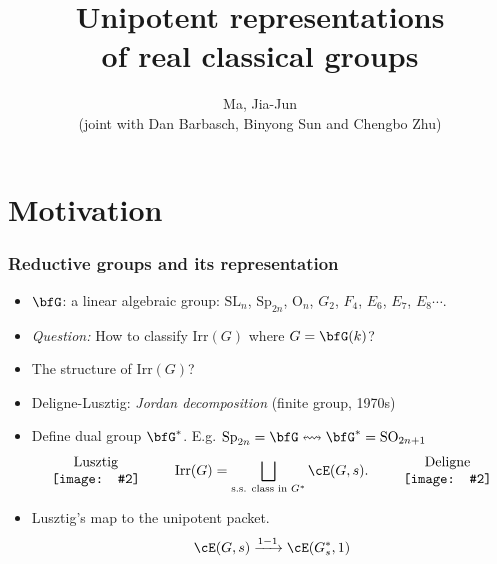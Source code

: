 \documentclass[t,11pt,usenames,dvipsnames]{beamer}
\title[Uni. Repn.]{Unipotent representations \\
of real classical groups}
\author[Ma, Jia-Jun]{Ma, Jia-Jun\\[2em] 
(joint with Dan Barbasch, Binyong Sun and  Chengbo Zhu)
}
\institute[SJTU]{School of Mathematical Sciences\\
Shanghai Jiao Tong University}
\theoremstyle{plain}
\theoremstyle{definition}
\newcommand{\rO}{\mathrm{O}}
\newcommand{\SO}{\mathrm{SO}}
\def\Sp{{\mathrm{Sp}}}
\def\SL{{\mathrm{SL}}}
\def\Irr{{\mathrm{Irr}}}
\def\blue{\color{blue}}
\let\oldemph\emph
\def\emph#1{\oldemph{\blue #1}}
\begin{document}
\begin{frame}[plain,label=tt]
    
    \titlepage
    \vspace{-3em}
\end{frame}



\def\vgraph#1#2{\ensuremath{\vcenter{\hbox{\texttt{[image: \#2]}}}}}
\def\hgraph#1#2{\ensuremath{\vcenter{\hbox{\texttt{[image: \#2]}}}}}
\def\hhgraph#1#2#3{\ensuremath{\begin{array}{c}\text{#3}\\
        \hbox{\texttt{[image: \#2]}}
        \end{array}}}
    \section{Motivation}

    \begin{frame}
      \frametitle{Reductive groups and its representation}
      \begin{itemize}[<+->]
        \item $\bfG$: a linear algebraic group: $\SL_{n}$, $\Sp_{2n}$, $\rO_{n}$,
              $G_{2}$, $F_{4}$, $E_{6}$, $E_{7}$, $E_{8}\cdots$.
        \item \emph{Question:} How to classify \emph{$\Irr(G)$} where $G= \bfG(k)$?
        \item The structure of $\Irr(G)$?
        \item Deligne-Lusztig: \emph{Jordan decomposition} (finite group, 1970s)
        \item[] Define dual group $\bfG^{*}$.
            E.g. $\Sp_{2n} = \bfG\leftrightsquigarrow \bfG^{*} = \SO_{2n+1}$\\
        \[
             \hhgraph{0.13\textwidth}{Lusztig}{Lusztig} \hspace{2em}
             \Irr(G) = \displaystyle \bigsqcup_{\text{s.s. class in } G^{*}} \cE(G, s).
             \hspace{2em}
             \hhgraph{0.13\textwidth}{Deligne}{Deligne}
            \]
        \item[] Lusztig's map to the unipotent packet.
        \[
          \cE(G,s)\xrightarrow{ 1-1 } \cE(G^{*}_{s},1)
        \]
      \end{itemize}
    \end{frame}
\end{document}
